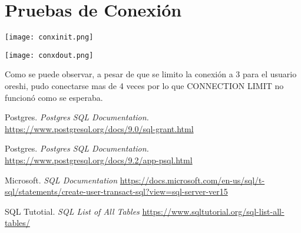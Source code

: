\documentclass[letterpaper]{article}
\begin{document}
\section{Pruebas de Conexión} \par
\texttt{[image: conxinit.png]} \par
\texttt{[image: conxdout.png]} \par

Como se puede observar, a pesar de que se limito la conexión a 3 para el usuario oreshi, pudo conectarse mas de 4 veces por lo que CONNECTION LIMIT no funcionó como se esperaba.

\begin{thebibliography}{4}
Postgres.
\textit{Postgres SQL Documentation.}
\url{https://www.postgresql.org/docs/9.0/sql-grant.html}

Postgres.
\textit{Postgres SQL Documentation.}
\url{https://www.postgresql.org/docs/9.2/app-psql.html}

Microsoft.
\textit{SQL Documentation}
\url{https://docs.microsoft.com/en-us/sql/t-sql/statements/create-user-transact-sql?view=sql-server-ver15}

SQL Tutotial.
\textit{SQL List of All Tables}
\url{https://www.sqltutorial.org/sql-list-all-tables/}
\end{thebibliography}
\end{document}
